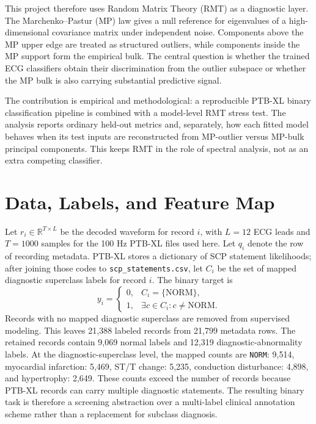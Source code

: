 \documentclass{article}
\newcommand{\R}{\mathbb{R}}
\begin{document}
This project therefore uses Random Matrix Theory (RMT) as a diagnostic layer. The Marchenko--Pastur (MP) law gives a null reference for eigenvalues of a high-dimensional covariance matrix under independent noise. Components above the MP upper edge are treated as structured outliers, while components inside the MP support form the empirical bulk. The central question is whether the trained ECG classifiers obtain their discrimination from the outlier subspace or whether the MP bulk is also carrying substantial predictive signal.

The contribution is empirical and methodological: a reproducible PTB-XL binary classification pipeline is combined with a model-level RMT stress test. The analysis reports ordinary held-out metrics and, separately, how each fitted model behaves when its test inputs are reconstructed from MP-outlier versus MP-bulk principal components. This keeps RMT in the role of spectral analysis, not as an extra competing classifier.

\section{Data, Labels, and Feature Map}

Let \(r_i\in\R^{T\times L}\) be the decoded waveform for record \(i\), with \(L=12\) ECG leads and \(T=1000\) samples for the 100 Hz PTB-XL files used here. Let \(q_i\) denote the row of recording metadata. PTB-XL stores a dictionary of SCP statement likelihoods; after joining those codes to \texttt{scp\_statements.csv}, let \(C_i\) be the set of mapped diagnostic superclass labels for record \(i\). The binary target is
\begin{equation}
  y_i =
  \begin{cases}
    0, & C_i=\{\mathrm{NORM}\},\\
    1, & \exists c\in C_i: c\ne \mathrm{NORM}.
  \end{cases}
  \label{eq:target}
\end{equation}
Records with no mapped diagnostic superclass are removed from supervised modeling. This leaves 21,388 labeled records from 21,799 metadata rows. The retained records contain 9,069 normal labels and 12,319 diagnostic-abnormality labels. At the diagnostic-superclass level, the mapped counts are \texttt{NORM}: 9,514, myocardial infarction: 5,469, ST/T change: 5,235, conduction disturbance: 4,898, and hypertrophy: 2,649. These counts exceed the number of records because PTB-XL records can carry multiple diagnostic statements. The resulting binary task is therefore a screening abstraction over a multi-label clinical annotation scheme rather than a replacement for subclass diagnosis.
\end{document}
